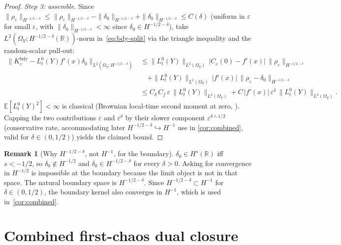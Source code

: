 \documentclass[11pt,reqno]{amsart}
\theoremstyle{plain}
\theoremstyle{definition}
\newtheorem{remark}[theorem]{Remark}
\theoremstyle{remark}
\newcommand{\R}{\mathbb{R}}
\newcommand{\E}{\mathbb{E}}
\begin{document}
\begin{proof}
\emph{Step 3: assemble.}
Since $\|\rho_{\varepsilon}\|_{H^{-1/2-\delta}}\le
\|\rho_{\varepsilon}\|_{H^{-1/2-\delta}}-\|\delta_{0}\|_{H^{-1/2-\delta}}+\|\delta_{0}\|_{H^{-1/2-\delta}}\le C(\delta)$
(uniform in $\varepsilon$ for small $\varepsilon$, with
$\|\delta_{0}\|_{H^{-1/2-\delta}}<\infty$ since $\delta_{0}\in H^{-1/2-\delta}$),
take $L^{2}(\Omega_{Y};H^{-1/2-\delta}(\R))$-norm
in~\eqref{eq:bdy-split} via the triangle inequality and the
random-scalar pull-out:
\begin{align*}
 \bigl\|K_{\varepsilon}^{\mathrm{bdy}}-L_{t}^{0}(Y)f'(x)\delta_{0}\bigr\|_{L^{2}(\Omega_{Y};H^{-1/2-\delta})}
 &\le\|L_{t}^{0}(Y)\|_{L^{2}(\Omega_{Y})}\,|C_{\varepsilon}(0)-f'(x)|\,\|\rho_{\varepsilon}\|_{H^{-1/2-\delta}}\\
 &\quad+\|L_{t}^{0}(Y)\|_{L^{2}(\Omega_{Y})}\,|f'(x)|\,\|\rho_{\varepsilon}-\delta_{0}\|_{H^{-1/2-\delta}}\\
 &\le C_{\delta}\,C_{f}\,\varepsilon\,\|L_{t}^{0}(Y)\|_{L^{2}(\Omega_{Y})}
  + C\,|f'(x)|\,\varepsilon^{\delta}\,\|L_{t}^{0}(Y)\|_{L^{2}(\Omega_{Y})}.
\end{align*}
$\E[L_{t}^{0}(Y)^{2}]<\infty$ is classical (Brownian local-time
second moment at zero,
\cite[Theorem 6.1.1]{MarcusRosen}). Capping the two
contributions $\varepsilon$ and $\varepsilon^{\delta}$ by their
slower component $\varepsilon^{\delta\wedge 1/2}$ (conservative
rate, accommodating later $H^{-1/2-\delta}\hookrightarrow H^{-1}$
use in \cref{cor:combined}, valid for $\delta\in(0,1/2)$) yields
the claimed bound.
\end{proof}

\begin{remark}[Why
\texorpdfstring{$H^{-1/2-\delta}$}{H\textasciicircum-1/2-delta},
not \texorpdfstring{$H^{-1}$}{H\textasciicircum-1}, for the boundary]
$\delta_{0}\in H^{s}(\R)$ iff $s<-1/2$, so $\delta_{0}\notin H^{-1/2}$
and $\delta_{0}\in H^{-1/2-\delta}$ for every $\delta>0$. Asking
for convergence in $H^{-1/2}$ is impossible at the boundary because
the limit object is not in that space. The natural boundary space is
$H^{-1/2-\delta}$. Since $H^{-1/2-\delta}\subset H^{-1}$ for
$\delta\in(0,1/2)$, the boundary kernel also converges in $H^{-1}$,
which is used in~\cref{cor:combined}.
\end{remark}

\section{Combined first-chaos dual closure}\label{sec:combined}
\end{document}
